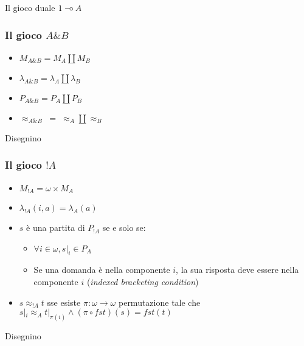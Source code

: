 \documentclass{beamer}
\newcommand{\limp}{\mathbin{{-}\mkern-3.5mu{\circ}}}
\begin{document}
\begin{frame}
	
	Il gioco duale $1 \limp A$
	
\end{frame}


\begin{frame}
	
	\frametitle{Il gioco $A \& B$}
	
	\begin{itemize}
		\item $M_{A\& B}=M_A \coprod M_B$
		\item $\lambda_{A\& B}=\lambda_A \coprod \lambda_B$
		\item $P_{A\& B}=P_A \coprod P_B$
		\item $\approx_{A\& B} \; = \; \approx_A \coprod \approx_B$ 
	\end{itemize}
	
	Disegnino
	
\end{frame}

\begin{frame}
	
	\frametitle{Il gioco $!A$}
	
	\begin{itemize}
		\item $M_{!A}=\omega \times M_A$
		\item $\lambda_{!A}(i,a)=\lambda_A(a)$
		\item $s$ è una partita di $P_{!A}$ se e solo se:
		\begin{itemize}
			\item $\forall i\in \omega , s|_i \in P_A$
			\item Se una domanda è nella componente $i$, la sua risposta deve essere nella componente $i$ (\emph{indexed bracketing condition})
		\end{itemize}

		\item $s\approx_{!A} t$ sse esiste $\pi:\omega \rightarrow \omega$ permutazione tale che $s|_i \approx_A t|_{\pi(i)} \wedge (\pi \circ fst)(s)=fst(t)$
	\end{itemize}
	
	Disegnino
	
\end{frame}
\end{document}
